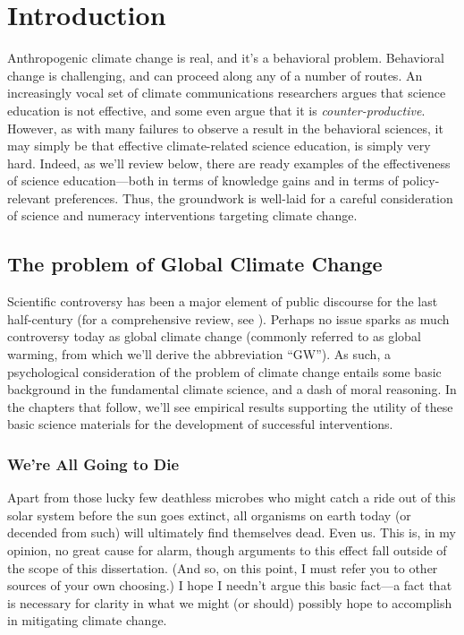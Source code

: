 \graphicspath{{intro/}}

\chapter{Introduction} \label{chap:intro}

Anthropogenic climate change is real, and it's a behavioral problem. Behavioral
change is challenging, and can proceed along any of a number of routes. An
increasingly vocal set of climate communications researchers argues that science
education is not effective, and some even argue that it is
\emph{counter-productive}.  However, as with many failures to observe a result
in the behavioral sciences, it may simply be that effective climate-related
science education, is simply very hard. Indeed, as we'll review below, there are
ready examples of the effectiveness of science education---both in terms of
knowledge gains and in terms of policy-relevant preferences. Thus, the
groundwork is well-laid for a careful consideration of science and numeracy
interventions targeting climate change.

\section{The problem of Global Climate Change}

Scientific controversy has been a major element of public discourse for the last
half-century (for a comprehensive review, see \cite{oreskes_merchants_2010}).
Perhaps no issue sparks as much controversy today as global climate change
(commonly referred to as global warming, from which we'll derive the
abbreviation “GW”). As such, a psychological consideration of the problem of
climate change entails some basic background in the fundamental climate science,
and a dash of moral reasoning. In the chapters that follow, we'll see empirical
results supporting the utility of these basic science materials for the
development of successful interventions.

\subsection{We're All Going to Die}

Apart from those lucky few deathless microbes who might catch a ride out of this
solar system before the sun goes extinct, all organisms on earth today (or
decended from such) will ultimately find themselves dead. Even us. This is, in
my opinion, no great cause for alarm, though arguments to this effect fall
outside of the scope of this dissertation. (And so, on this point, I must refer
you to other sources of your own choosing.) I hope I needn't argue this basic
fact---a fact that is necessary for clarity in what we might (or should)
possibly hope to accomplish in mitigating climate change.

